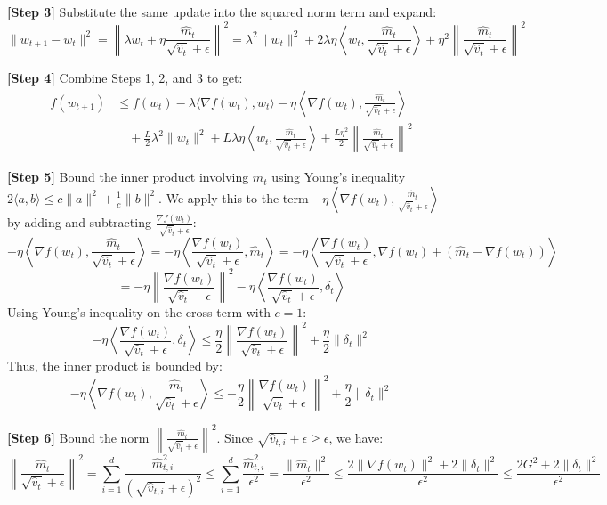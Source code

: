 \documentclass{article}
\begin{document}
\textbf{[Step 3]} Substitute the same update into the squared norm term and expand:
$$ \|w_{t+1} - w_t\|^2 = \left\| \lambda w_t + \eta \frac{\hat{m}_t}{\sqrt{\hat{v}_t} + \epsilon} \right\|^2 = \lambda^2 \|w_t\|^2 + 2 \lambda \eta \left\langle w_t, \frac{\hat{m}_t}{\sqrt{\hat{v}_t} + \epsilon} \right\rangle + \eta^2 \left\| \frac{\hat{m}_t}{\sqrt{\hat{v}_t} + \epsilon} \right\|^2 $$

\textbf{[Step 4]} Combine Steps 1, 2, and 3 to get:
\begin{align*}
f(w_{t+1}) &\leq f(w_t) - \lambda \langle \nabla f(w_t), w_t \rangle - \eta \left\langle \nabla f(w_t), \frac{\hat{m}_t}{\sqrt{\hat{v}_t} + \epsilon} \right\rangle \\
&\quad + \frac{L}{2} \lambda^2 \|w_t\|^2 + L \lambda \eta \left\langle w_t, \frac{\hat{m}_t}{\sqrt{\hat{v}_t} + \epsilon} \right\rangle + \frac{L \eta^2}{2} \left\| \frac{\hat{m}_t}{\sqrt{\hat{v}_t} + \epsilon} \right\|^2
\end{align*}

\textbf{[Step 5]} Bound the inner product involving $\hat{m}_t$ using Young's inequality $2\langle a, b \rangle \leq c \|a\|^2 + \frac{1}{c} \|b\|^2$. We apply this to the term $- \eta \left\langle \nabla f(w_t), \frac{\hat{m}_t}{\sqrt{\hat{v}_t} + \epsilon} \right\rangle$ by adding and subtracting $\frac{\nabla f(w_t)}{\sqrt{\hat{v}_t} + \epsilon}$:
$$ -\eta \left\langle \nabla f(w_t), \frac{\hat{m}_t}{\sqrt{\hat{v}_t} + \epsilon} \right\rangle = -\eta \left\langle \frac{\nabla f(w_t)}{\sqrt{\hat{v}_t} + \epsilon}, \hat{m}_t \right\rangle = -\eta \left\langle \frac{\nabla f(w_t)}{\sqrt{\hat{v}_t} + \epsilon}, \nabla f(w_t) + (\hat{m}_t - \nabla f(w_t)) \right\rangle $$
$$ = -\eta \left\| \frac{\nabla f(w_t)}{\sqrt{\hat{v}_t} + \epsilon} \right\|^2 - \eta \left\langle \frac{\nabla f(w_t)}{\sqrt{\hat{v}_t} + \epsilon}, \delta_t \right\rangle $$
Using Young's inequality on the cross term with $c = 1$:
$$ -\eta \left\langle \frac{\nabla f(w_t)}{\sqrt{\hat{v}_t} + \epsilon}, \delta_t \right\rangle \leq \frac{\eta}{2} \left\| \frac{\nabla f(w_t)}{\sqrt{\hat{v}_t} + \epsilon} \right\|^2 + \frac{\eta}{2} \|\delta_t\|^2 $$
Thus, the inner product is bounded by:
$$ -\eta \left\langle \nabla f(w_t), \frac{\hat{m}_t}{\sqrt{\hat{v}_t} + \epsilon} \right\rangle \leq -\frac{\eta}{2} \left\| \frac{\nabla f(w_t)}{\sqrt{\hat{v}_t} + \epsilon} \right\|^2 + \frac{\eta}{2} \|\delta_t\|^2 $$

\textbf{[Step 6]} Bound the norm $\left\| \frac{\hat{m}_t}{\sqrt{\hat{v}_t} + \epsilon} \right\|^2$. Since $\sqrt{\hat{v}_{t,i}} + \epsilon \geq \epsilon$, we have:
$$ \left\| \frac{\hat{m}_t}{\sqrt{\hat{v}_t} + \epsilon} \right\|^2 = \sum_{i=1}^d \frac{\hat{m}_{t,i}^2}{(\sqrt{\hat{v}_{t,i}} + \epsilon)^2} \leq \sum_{i=1}^d \frac{\hat{m}_{t,i}^2}{\epsilon^2} = \frac{\|\hat{m}_t\|^2}{\epsilon^2} \leq \frac{2 \|\nabla f(w_t)\|^2 + 2 \|\delta_t\|^2}{\epsilon^2} \leq \frac{2 G^2 + 2 \|\delta_t\|^2}{\epsilon^2} $$
\end{document}
